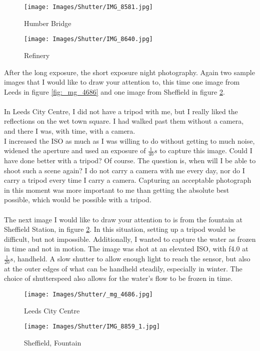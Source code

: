\begin{figure}[htb]
\begin{minipage}{.5\textwidth}
	\centering
		\texttt{[image: Images/Shutter/IMG\_8581.jpg]}
	\caption{Humber Bridge}
	\label{fig:IMG_8581}
\end{minipage}
\begin{minipage}{.5\textwidth}
	\centering
		\texttt{[image: Images/Shutter/IMG\_8640.jpg]}
	\caption{Refinery}
	\label{fig:IMG_8640}
\end{minipage}
\end{figure}

After the long \gls{exposure}, the short \gls{exposure} night photography. Again two sample images that I would like to draw your attention to, this time one image from Leeds in figure \ref{fig:_mg_4686} and one image from Sheffield in figure \ref{fig:IMG_8859_1}.
\\
\\
In Leeds City Centre, I did not have a tripod with me, but I really liked the reflections on the wet town square. I had walked past them without a camera, and there I was, with time, with a camera.
\\
I increased the \gls{ISO} as much as I was willing to do without getting to much noise, widened the \gls{aperture} and used an \gls{exposure} of $\frac{1}{40}s$ to capture this image. Could I have done better with a tripod? Of course. The question is, when will I be able to shoot such a scene again? I do not carry a camera with me every day, nor do I carry a tripod every time I carry a camera. Capturing an acceptable photograph in this moment was more important to me than getting the absolute best possible, which would be possible with a tripod.
\\
\\
The next image I would like to draw your attention to is from the fountain at Sheffield Station, in figure \ref{fig:IMG_8859_1}. In this situation, setting up a tripod would be difficult, but not impossible. Additionally, I wanted to capture the water as frozen in time and not in motion. The image was shot at an elevated \gls{ISO}, with f4.0 at $\frac{1}{20}s$, handheld. A slow \gls{shutter} to allow enough light to reach the sensor, but also at the outer edges of what can be handheld steadily, especially in winter. The choice of \gls{shutterspeed} also allows for the water's flow to be frozen in time.

\begin{figure}[hthb]
\begin{minipage}{.5\textwidth}
	\centering
		\texttt{[image: Images/Shutter/\_mg\_4686.jpg]}
	\caption{Leeds City Centre}
	\label{fig:_mg_4686}
\end{minipage}
\begin{minipage}{.5\textwidth}
	\centering
		\texttt{[image: Images/Shutter/IMG\_8859\_1.jpg]}
	\caption{Sheffield, Fountain}
	\label{fig:IMG_8859_1}
\end{minipage}
\end{figure}

